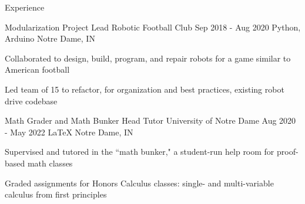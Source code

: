 \documentclass{resume} %
\begin{document}
\begin{rSection}{ Experience }

\begin{rSubsection}{ Modularization Project Lead \at Robotic Football Club }{ Sep 2018 - Aug 2020 }{ Python, Arduino }{ Notre Dame, IN }
\item Collaborated to design, build, program, and repair robots for a game similar to American football
\item Led team of 15 to refactor, for organization and best practices, existing robot drive codebase
\end{rSubsection}

\begin{rSubsection}{ Math Grader and Math Bunker Head Tutor \at University of Notre Dame }{ Aug 2020 - May 2022 }{ \LaTeX }{ Notre Dame, IN }
\item Supervised and tutored in the ``math bunker," a student-run help room for proof-based math classes
\item Graded assignments for Honors Calculus classes: single- and multi-variable calculus from first principles
\end{rSubsection}



\end{rSection}
\end{document}
